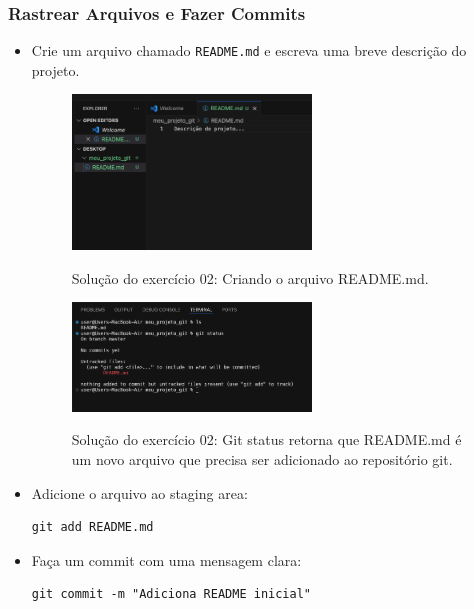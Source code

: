 \subsubsection{Rastrear Arquivos e Fazer Commits}
\begin{itemize}
    \item Crie um arquivo chamado \texttt{README.md} e escreva uma breve descrição do projeto.

       \begin{figure}[H]
        \centering
        \includegraphics[width=0.6\textwidth]{imgs/tutorial_github/ex02_01.png}
        \label{fig:ex02_01}
        \caption{Solução do exercício 02: Criando o arquivo README.md.}
    \end{figure}

    \begin{figure}[H]
        \centering
        \includegraphics[width=0.6\textwidth]{imgs/tutorial_github/ex02_01_01.png}
        \label{fig:ex02_01_01}
        \caption{Solução do exercício 02: Git status retorna que README.md é um novo arquivo que precisa ser adicionado ao repositório git.}
    \end{figure}
    
    \item Adicione o arquivo ao staging area:
    \begin{lstlisting}[style=shellstyle]
git add README.md
    \end{lstlisting}
    \item Faça um commit com uma mensagem clara:
    \begin{lstlisting}[style=shellstyle]
git commit -m "Adiciona README inicial"
    \end{lstlisting}


\end{itemize}
